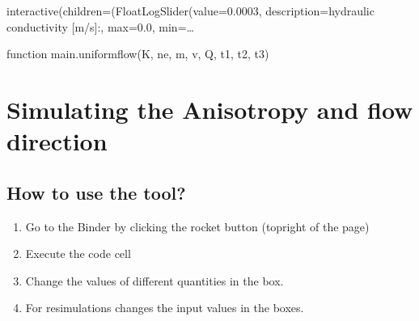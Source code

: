 \documentclass[letterpaper,10pt,english]{sphinxmanual}
\begin{document}
\begin{sphinxVerbatim}[commandchars=\\\{\}]
              
              
         
\end{sphinxVerbatim}

\begin{sphinxVerbatim}[commandchars=\\\{\}]
interactive(children=(FloatLogSlider(value=0.0003, description=\PYGZsq{}hydraulic conductivity [m/s]:\PYGZsq{}, max=0.0, min=\PYGZhy{}…
\end{sphinxVerbatim}

\begin{sphinxVerbatim}[commandchars=\\\{\}]
\PYGZlt{}function \PYGZus{}\PYGZus{}main\PYGZus{}\PYGZus{}.uniform\PYGZus{}flow(K, ne, m, v, Q, t1, t2, t3)\PYGZgt{}
\end{sphinxVerbatim}


\section{Simulating the Anisotropy and flow direction}
\label{\detokenize{contents/tools/aniso2D:simulating-the-anisotropy-and-flow-direction}}\label{\detokenize{contents/tools/aniso2D::doc}}

\subsection{How to use the tool?}
\label{\detokenize{contents/tools/aniso2D:how-to-use-the-tool}}\begin{enumerate}
%
\item {} 
Go to the Binder by clicking the rocket button (top\sphinxhyphen{}right of the page)

\item {} 
Execute the code cell

\item {} 
Change the values of different quantities in the box.

\item {} 
For re\sphinxhyphen{}simulations \sphinxhyphen{} changes the input values in the boxes.

\end{enumerate}
\end{document}
